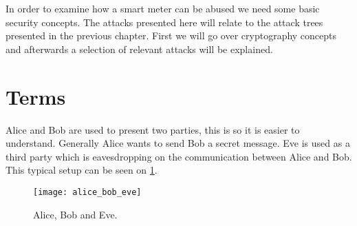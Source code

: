
In order to examine how a smart meter can be abused we need some basic security concepts.
The attacks presented here will relate to the attack trees presented in the previous chapter.
First we will go over cryptography concepts and afterwards a selection of relevant attacks will be explained.

\section{Terms}
Alice and Bob are used to present two parties, this is so it is easier to understand.
Generally Alice wants to send Bob a secret message.
Eve is used as a third party which is eavesdropping on the communication between Alice and Bob.
This typical setup can be seen on \cref{alice_bob_eve}.

\begin{figure}[H]
  \begin{center}
    \texttt{[image: alice\_bob\_eve]}
  \end{center}
  \caption[wat]{Alice, Bob and Eve.\footnotemark}
  \label{alice_bob_eve}
\end{figure}
